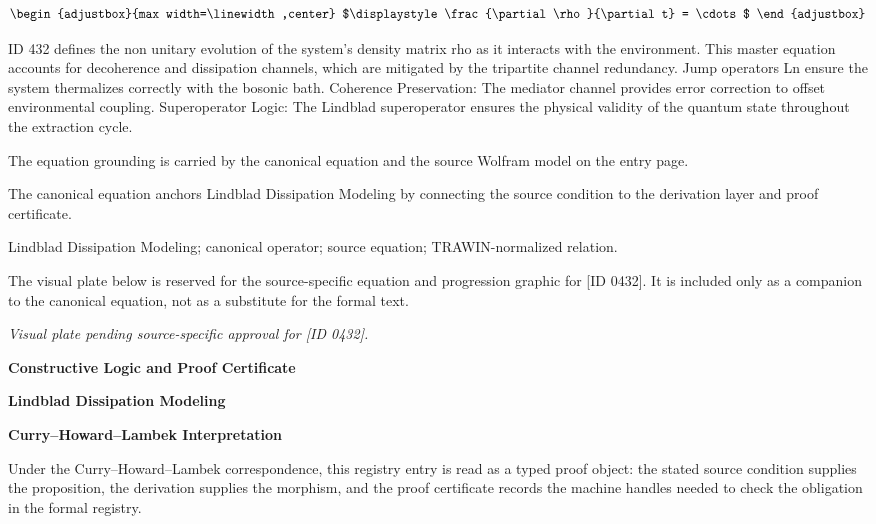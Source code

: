 \[
\begin{adjustbox}{max width=\linewidth,center}
$\displaystyle
\frac{\partial \rho}{\partial t} = \cdots
$
\end{adjustbox}
\]

ID 432 defines the non unitary evolution of the system's density matrix rho as it interacts with the environment. This master equation accounts for decoherence and dissipation channels, which are mitigated by the tripartite channel redundancy. Jump operators Ln ensure the system thermalizes correctly with the bosonic bath. Coherence Preservation: The mediator channel provides error correction to offset environmental coupling. Superoperator Logic: The Lindblad superoperator ensures the physical validity of the quantum state throughout the extraction cycle.

The equation grounding is carried by the canonical equation and the source Wolfram model on the entry page.

The canonical equation anchors Lindblad Dissipation Modeling by connecting the source condition to the derivation layer and proof certificate.

Lindblad Dissipation Modeling; canonical operator; source equation; TRAWIN-normalized relation.
\endgroup

\begingroup\footnotesize\sloppy
The visual plate below is reserved for the source-specific equation and progression graphic for [ID 0432]. It is included only as a companion to the canonical equation, not as a substitute for the formal text.
\par\endgroup
\begingroup\footnotesize\itshape
Visual plate pending source-specific approval for [ID 0432].
\par\endgroup

\clearpage
\begingroup\tzpsupportsetup
\noindent\textbf{\fontsize{10.8pt}{12.8pt}\selectfont [ID 0432] Constructive Logic and Proof Certificate}\par
\noindent\textbf{\fontsize{10pt}{12pt}\selectfont Lindblad Dissipation Modeling}\par
\vspace{0.45em}
\begingroup
\footnotesize
\setlength{\parskip}{0.22em}
\setlength{\parindent}{0pt}
\noindent\textbf{Curry--Howard--Lambek Interpretation}\par
Under the Curry--Howard--Lambek correspondence, this registry entry is read as a typed proof
object: the stated source condition supplies the proposition, the derivation supplies the
morphism, and the proof certificate records the machine handles needed to check the obligation
in the formal registry.

